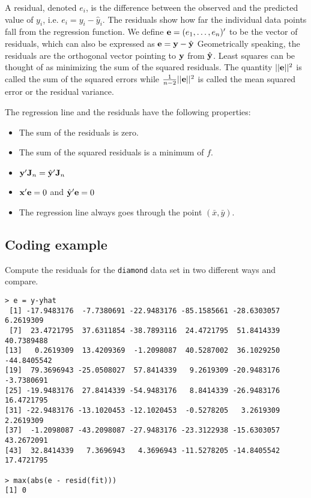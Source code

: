 A residual, denoted $e_i$, is the difference between the observed and the predicted value of $y_i$, i.e. 
$e_i = y_i - \hat y_i$. 
The residuals show how far the individual data points fall from the regression function.
We define $\mathbf{e} = (e_1, \ldots, e_n)'$ to be the vector of residuals, which can also be expressed as  $\mathbf{e} =  \mathbf{y} - \hat {\mathbf{y}}$
Geometrically speaking, the residuals are the orthogonal vector pointing
to $\mathbf{y}$ from $\hat {\mathbf{y}}$. Least squares can be thought of as minimizing
the sum of the squared residuals. The quantity
$||\mathbf{e}||^2 $ is called the sum of the squared errors while $\frac{1}{n-2}||\mathbf{e}||^2$ is
called the mean squared error or the residual variance.

\bnote
The regression line and the residuals have the following properties:
\begin{itemize}
\item The sum of the residuals is zero.
\item The sum of the squared residuals is a minimum of $f$.
\item $\mathbf{y}' \mathbf{J}_n = \hat {\mathbf{y}}' \mathbf{J}_n$
\item $\mathbf{x}' \mathbf{e} = 0$ and $\hat {\mathbf{y}}' \mathbf{e} = 0$
\item The regression line always goes through the point $(\bar x, \bar y)$.
\end{itemize}
\enote

\subsection{Coding example}

Compute the residuals for the {\tt diamond} data set  in two different ways and compare.
\begin{verbatim}
> e = y-yhat
 [1] -17.9483176  -7.7380691 -22.9483176 -85.1585661 -28.6303057   6.2619309
 [7]  23.4721795  37.6311854 -38.7893116  24.4721795  51.8414339  40.7389488
[13]   0.2619309  13.4209369  -1.2098087  40.5287002  36.1029250 -44.8405542
[19]  79.3696943 -25.0508027  57.8414339   9.2619309 -20.9483176  -3.7380691
[25] -19.9483176  27.8414339 -54.9483176   8.8414339 -26.9483176  16.4721795
[31] -22.9483176 -13.1020453 -12.1020453  -0.5278205   3.2619309   2.2619309
[37]  -1.2098087 -43.2098087 -27.9483176 -23.3122938 -15.6303057  43.2672091
[43]  32.8414339   7.3696943   4.3696943 -11.5278205 -14.8405542  17.4721795

> max(abs(e - resid(fit)))
[1] 0
\end{verbatim}


